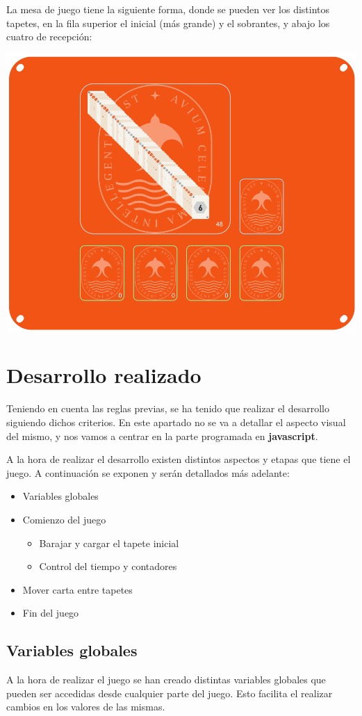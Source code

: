 \documentclass{\ClassPath/viu-tfm-template}
\begin{document}
La mesa de juego tiene la siguiente forma, donde se pueden ver los distintos tapetes, en la fila superior el inicial (más grande) y el sobrantes, y abajo los cuatro de recepción:
\begin{center}
    \includegraphics[width=0.7\linewidth]{img/mesa.png}
\end{center}


\chapter{Desarrollo realizado}

Teniendo en cuenta las reglas previas, se ha tenido que realizar el desarrollo siguiendo dichos criterios. En este apartado no se va a detallar el aspecto visual del mismo, y nos vamos a centrar en la parte programada en \textbf{javascript}.

A la hora de realizar el desarrollo existen distintos aspectos y etapas que tiene el juego. A continuación se exponen y serán detallados más adelante:

\begin{itemize}
    \item Variables globales
    \item Comienzo del juego
    \begin{itemize}
        \item Barajar y cargar el tapete inicial
        \item Control del tiempo y contadores
    \end{itemize}
    \item Mover carta entre tapetes
    \item Fin del juego
\end{itemize}
\vspace{-1em}


\section{Variables globales}
A la hora de realizar el juego se han creado distintas variables globales que pueden ser accedidas desde cualquier parte del juego. Esto facilita el realizar cambios en los valores de las mismas.
\end{document}
